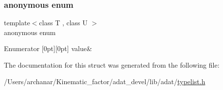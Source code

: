 \subsubsection{\texorpdfstring{anonymous enum}{anonymous enum}}
{\footnotesize\ttfamily template$<$class T , class U $>$ \\
anonymous enum}

\begin{DoxyEnumFields}{Enumerator}
[0pt][0pt]{}\mbox{\label{structUtil_1_1TL_1_1Length_3_01Typelist_3_01T_00_01U_01_4_01_4_ac90c2b2a9b0c8feb3ecdd90c7754325eae1c428995e62753898edb88edcd08ba4}} 
value&\\
\hline

\end{DoxyEnumFields}


The documentation for this struct was generated from the following file\+:\begin{DoxyCompactItemize}
\item 
/\+Users/archanar/\+Kinematic\+\_\+factor/adat\+\_\+devel/lib/adat/\mbox{\hyperlink{lib_2adat_2typelist_8h}{typelist.\+h}}\end{DoxyCompactItemize}
